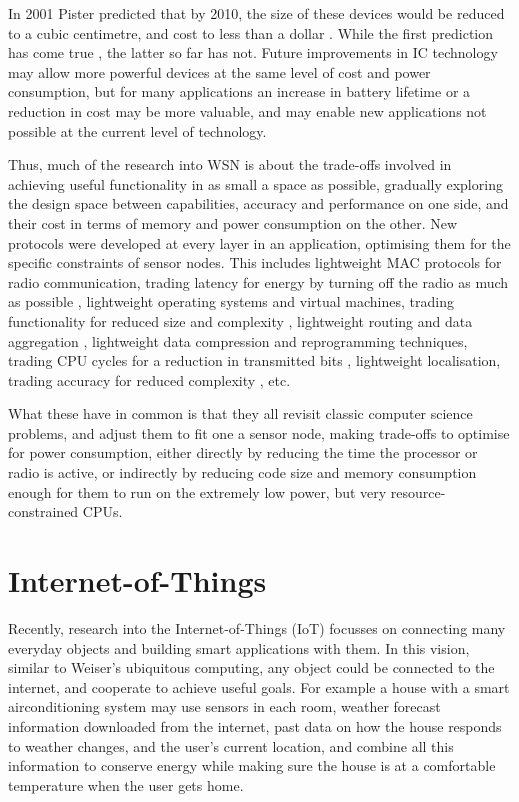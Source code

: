In 2001 Pister predicted that by 2010, the size of these devices would be reduced to a cubic centimetre, and cost to less than a dollar \cite{Pister:2001vr}. While the first prediction has come true \cite{Wang:2014cq}, the latter so far has not. Future improvements in IC technology may allow more powerful devices at the same level of cost and power consumption, but for many applications an increase in battery lifetime or a reduction in cost may be more valuable, and may enable new applications not possible at the current level of technology.

Thus, much of the research into WSN is about the trade-offs involved in achieving useful functionality in as small a space as possible, gradually exploring the design space between capabilities, accuracy and performance on one side, and their cost in terms of memory and power consumption on the other. New protocols were developed at every layer in an application, optimising them for the specific constraints of sensor nodes. This includes lightweight MAC protocols for radio communication, trading latency for energy by turning off the radio as much as possible \cite{Ye:2002uv, vanDam:2018tr}, lightweight operating systems and virtual machines, trading functionality for reduced size and complexity \cite{Levis:2004ws, Gu:2006ww, Han:2005th, Levis:2002ku, Brouwers:2009cj}, lightweight routing and data aggregation \cite{Intanogonwiwat:2018wz, Braginsky:2002wg}, lightweight data compression and reprogramming techniques, trading CPU cycles for a reduction in transmitted bits \cite{Marcelloni:2009ja, Reijers:2003ww}, lightweight localisation, trading accuracy for reduced complexity \cite{Niculescu:2001bl, Savarese:2002tx, Savvides:2002uf}, etc.

What these have in common is that they all revisit classic computer science problems, and adjust them to fit one a sensor node, making trade-offs to optimise for power consumption, either directly by reducing the time the processor or radio is active, or indirectly by reducing code size and memory consumption enough for them to run on the extremely low power, but very resource-constrained CPUs.

\section{Internet-of-Things}
\label{sec-introduction-iot}
Recently, research into the Internet-of-Things (IoT) focusses on connecting many everyday objects and building smart applications with them. In this vision, similar to Weiser's ubiquitous computing, any object could be connected to the internet, and cooperate to achieve useful goals. For example a house with a smart airconditioning system may use sensors in each room, weather forecast information downloaded from the internet, past data on how the house responds to weather changes, and the user's current location, and combine all this information to conserve energy while making sure the house is at a comfortable temperature when the user gets home.


